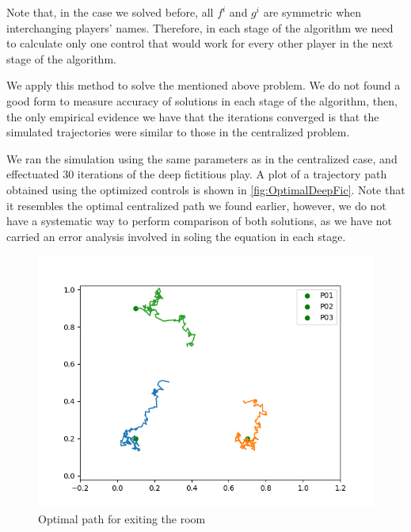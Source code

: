 Note that, in the case we solved before, all $f^i$ and $g^i$ are symmetric when interchanging players' names. Therefore, in each stage of the algorithm we need to calculate only one control that would work for every other player in the next stage of the algorithm.  

We apply this method to solve the mentioned above problem. We do not found a good form to measure accuracy of solutions in each stage of the algorithm, then, the only empirical evidence we have that the iterations converged is that the simulated trajectories were similar to those in the centralized problem. 

We ran the simulation using the same parameters as in the centralized case, and effectuated 30 iterations of the deep fictitious play. A plot of a trajectory path obtained using the optimized controls is shown in \autoref{fig:OptimalDeepFic}. Note that it resembles the optimal centralized path we found earlier, however, we do not have a systematic way to perform comparison of both solutions, as we have not carried an error analysis involved in soling the equation in each stage.

\begin{figure}[H]
	\centering
	\includegraphics[width=0.7\linewidth]{images/OptimalLQRDeepFictitus.png}
	\caption{Optimal path for exiting the room}
	\label{fig:OptimalDeepFic}
\end{figure}

